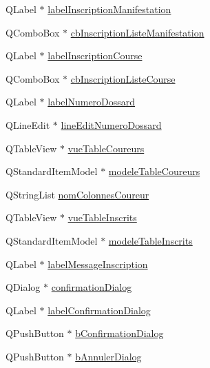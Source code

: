 \begin{DoxyCompactItemize}
Q\+Label $\ast$ \hyperlink{class_i_h_m_gestion_cross_affb681e48eb407d5d69d1ecb24da8377}{label\+Inscription\+Manifestation}
\item 
Q\+Combo\+Box $\ast$ \hyperlink{class_i_h_m_gestion_cross_a317ffd7cc1c9aa5d6e55c53568e44f98}{cb\+Inscription\+Liste\+Manifestation}
\item 
Q\+Label $\ast$ \hyperlink{class_i_h_m_gestion_cross_a88b058cc1d4031891e26eb62409af6bb}{label\+Inscription\+Course}
\item 
Q\+Combo\+Box $\ast$ \hyperlink{class_i_h_m_gestion_cross_aff44e6f1a225ee5b55783afe72049f83}{cb\+Inscription\+Liste\+Course}
\item 
Q\+Label $\ast$ \hyperlink{class_i_h_m_gestion_cross_a3209e0dfc51bb3a17e2ef700a778178b}{label\+Numero\+Dossard}
\item 
Q\+Line\+Edit $\ast$ \hyperlink{class_i_h_m_gestion_cross_adeb4cfc9a218c06fca5cabc280a611e2}{line\+Edit\+Numero\+Dossard}
\item 
Q\+Table\+View $\ast$ \hyperlink{class_i_h_m_gestion_cross_a4a0ba98c5b671a38d67942254d2329db}{vue\+Table\+Coureurs}
\item 
Q\+Standard\+Item\+Model $\ast$ \hyperlink{class_i_h_m_gestion_cross_ad9560c4804694dbbf969de5f6f56eb30}{modele\+Table\+Coureurs}
\item 
Q\+String\+List \hyperlink{class_i_h_m_gestion_cross_ab95ce87fd2f9427023040cc8d0077681}{nom\+Colonnes\+Coureur}
\item 
Q\+Table\+View $\ast$ \hyperlink{class_i_h_m_gestion_cross_a79b4e49cf8b22c9894d366e08b722c55}{vue\+Table\+Inscrits}
\item 
Q\+Standard\+Item\+Model $\ast$ \hyperlink{class_i_h_m_gestion_cross_a19565551280115e642ceb9790c7317bc}{modele\+Table\+Inscrits}
\item 
Q\+Label $\ast$ \hyperlink{class_i_h_m_gestion_cross_a1855bd63290c39c20660064b41710e8c}{label\+Message\+Inscription}
\item 
Q\+Dialog $\ast$ \hyperlink{class_i_h_m_gestion_cross_a417b63ff11c3be6623d17718d9058768}{confirmation\+Dialog}
\item 
Q\+Label $\ast$ \hyperlink{class_i_h_m_gestion_cross_a9b51d06493979981248ecc2641f82be4}{label\+Confirmation\+Dialog}
\item 
Q\+Push\+Button $\ast$ \hyperlink{class_i_h_m_gestion_cross_a8aaf51ea455654df21f65ed496384b60}{b\+Confirmation\+Dialog}
\item 
Q\+Push\+Button $\ast$ \hyperlink{class_i_h_m_gestion_cross_a2efd604a10cae21b2f85e7196c3927fd}{b\+Annuler\+Dialog}
\end{DoxyCompactItemize}


